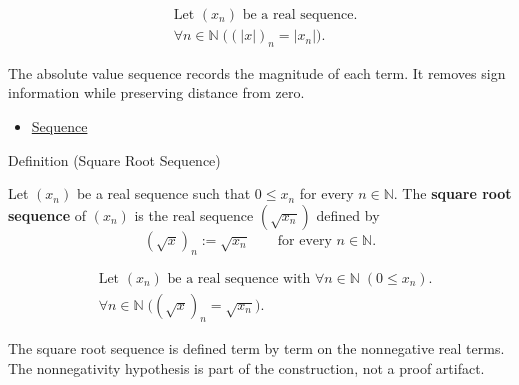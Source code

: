 \begin{remark*}
\[
\begin{aligned}
&\text{Let } (x_n) \text{ be a real sequence.}\\
&\forall n\in\mathbb{N}\;\bigl((|x|)_n=|x_n|\bigr).
\end{aligned}
\]
\end{remark*}

\begin{remark*}[Interpretation]
The absolute value sequence records the magnitude of each term. It removes
sign information while preserving distance from zero.
\end{remark*}

\begin{dependencies}
\begin{itemize}
  \item \hyperref[def:sequence]{Sequence}
\end{itemize}
\end{dependencies}


\begin{definitionbox}{Definition (Square Root Sequence)}
\begin{definition}
\label{def:square-root-sequence}
Let $(x_n)$ be a real sequence such that $0\le x_n$ for every
$n\in\mathbb{N}$. The \textbf{square root sequence} of $(x_n)$ is the real
sequence $(\sqrt{x_n})$ defined by
\[
(\sqrt{x})_n := \sqrt{x_n}
\qquad
\text{for every } n\in\mathbb{N}.
\]
\end{definition}
\end{definitionbox}

\begin{remark*}
\[
\begin{aligned}
&\text{Let } (x_n) \text{ be a real sequence with }
  \forall n\in\mathbb{N}\;(0\le x_n).\\
&\forall n\in\mathbb{N}\;\bigl((\sqrt{x})_n=\sqrt{x_n}\bigr).
\end{aligned}
\]
\end{remark*}

\begin{remark*}[Interpretation]
The square root sequence is defined term by term on the nonnegative real
terms. The nonnegativity hypothesis is part of the construction, not a proof
artifact.
\end{remark*}

